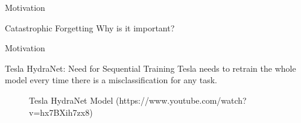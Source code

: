 \documentclass[aspectratio=169]{beamer}
\begin{document}
	\begin{frame}{Motivation}
	    \begin{block}{Catastrophic Forgetting}
		\centering
		Why is it important?
	    \end{block}
	\end{frame}
	\begin{frame}{Motivation}
	    \begin{block}{Tesla HydraNet: Need for Sequential Training}
		Tesla needs to retrain the whole model every time there is a misclassification for any task.
	    \end{block}
	    \begin{figure}
		\centering
		
		\caption{Tesla HydraNet Model (https://www.youtube.com/watch?v=hx7BXih7zx8)}
		\label{fig:neural_arch}
	    \end{figure}
	\end{frame}
\end{document}
